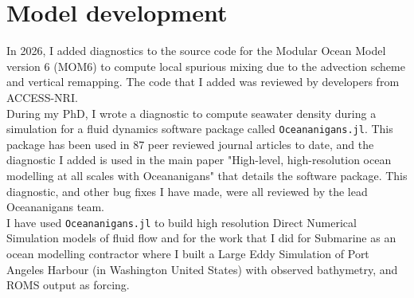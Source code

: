 \section{Model development}
In 2026, I added diagnostics to the source code for the Modular Ocean Model version 6 (MOM6) to compute local spurious mixing due to the advection scheme and vertical remapping.
The code that I added was reviewed by developers from ACCESS-NRI. \\
\vspace{0.5em}
During my PhD, I wrote a diagnostic to compute seawater density during a simulation for a fluid dynamics software package called \texttt{Oceananigans.jl}.
This package has been used in 87 peer reviewed journal articles to date, and the diagnostic I added is used in the main paper "High-level, high-resolution ocean modelling at all scales with Oceananigans" that details the software package.
This diagnostic, and other bug fixes I have made, were all reviewed by the lead Oceananigans team. \\
\vspace{0.5em}
I have used \texttt{Oceananigans.jl} to build high resolution Direct Numerical Simulation models of fluid flow and for the work that I did for Submarine as an ocean modelling contractor where I built a Large Eddy Simulation of Port Angeles Harbour (in Washington United States) with observed bathymetry, and ROMS output as forcing.
